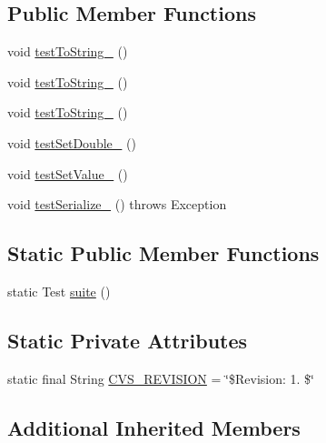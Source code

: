\subsection*{Public Member Functions}
\begin{DoxyCompactItemize}
\item 
void \hyperlink{classorg_1_1jgap_1_1distr_1_1_culture_memory_cell_test_a717fb6f6097a249f9557a08fabfde599}{test\-To\-String\-\_} ()
\item 
void \hyperlink{classorg_1_1jgap_1_1distr_1_1_culture_memory_cell_test_a034fa868813eae34047f7f127e7be503}{test\-To\-String\-\_} ()
\item 
void \hyperlink{classorg_1_1jgap_1_1distr_1_1_culture_memory_cell_test_a17be8b62fb6dfe056884df9a1e6459da}{test\-To\-String\-\_} ()
\item 
void \hyperlink{classorg_1_1jgap_1_1distr_1_1_culture_memory_cell_test_a11f7fecb46f7e319f2992d133aedfb22}{test\-Set\-Double\-\_} ()
\item 
void \hyperlink{classorg_1_1jgap_1_1distr_1_1_culture_memory_cell_test_aee85593bfea55bd31a4c53f2a1ca09ff}{test\-Set\-Value\-\_} ()
\item 
void \hyperlink{classorg_1_1jgap_1_1distr_1_1_culture_memory_cell_test_ac34da57b63535daa8be1a0db92f29c01}{test\-Serialize\-\_} ()  throws Exception 
\end{DoxyCompactItemize}
\subsection*{Static Public Member Functions}
\begin{DoxyCompactItemize}
\item 
static Test \hyperlink{classorg_1_1jgap_1_1distr_1_1_culture_memory_cell_test_a044391fca14cf30af8bc523b4f11e732}{suite} ()
\end{DoxyCompactItemize}
\subsection*{Static Private Attributes}
\begin{DoxyCompactItemize}
\item 
static final String \hyperlink{classorg_1_1jgap_1_1distr_1_1_culture_memory_cell_test_a88ab5c626c6a12dff296d53bf59adb90}{C\-V\-S\-\_\-\-R\-E\-V\-I\-S\-I\-O\-N} = \char`\"{}\$Revision\-: 1. \$\char`\"{}
\end{DoxyCompactItemize}
\subsection*{Additional Inherited Members}



